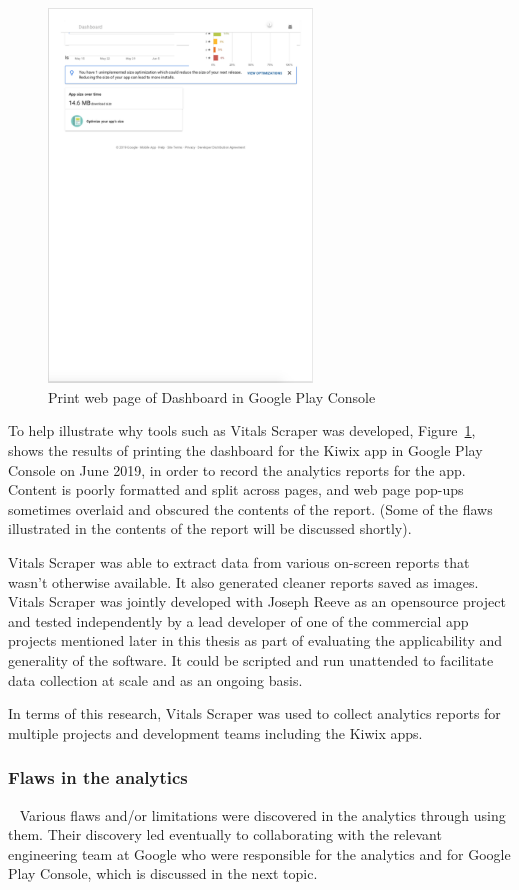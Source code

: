 \begin{figure}
    \includegraphics[width=7cm]{images/google-play-console/Dashboard - Kiwix-Google-Play-Console-(2019-Jun-14)-p4.png}
    \caption{Print web page of Dashboard in Google Play Console}
    \label{fig:screenshot-dashboard-gpc-kiwix}
\end{figure}

To help illustrate why tools such as Vitals Scraper was developed, Figure~\ref{fig:screenshot-dashboard-gpc-kiwix}, shows the results of printing the dashboard for the Kiwix app in Google Play Console on  June 2019, in order to record the analytics reports for the app. Content is poorly formatted and split across pages, and web page pop-ups sometimes overlaid and obscured the contents of the report. (Some of the flaws illustrated in the contents of the report will be discussed shortly).

Vitals Scraper was able to extract data from various on-screen reports that wasn't otherwise available. It also generated cleaner reports saved as images. Vitals Scraper was jointly developed with Joseph Reeve as an opensource project and tested independently by a lead developer of one of the commercial app projects mentioned later in this thesis as part of evaluating the applicability and generality of the software. It could be scripted and run unattended to facilitate data collection at scale and as an ongoing basis.

In terms of this research, Vitals Scraper was used to collect analytics reports for multiple projects and development teams including the Kiwix apps. 


\subsubsection{Flaws in the analytics}~\label{section-flaws-in-the-analytics}
Various flaws and/or limitations were discovered in the analytics through using them. Their discovery led eventually to collaborating with the relevant engineering team at Google who were responsible for the analytics and for Google Play Console, which is discussed in the next topic.

